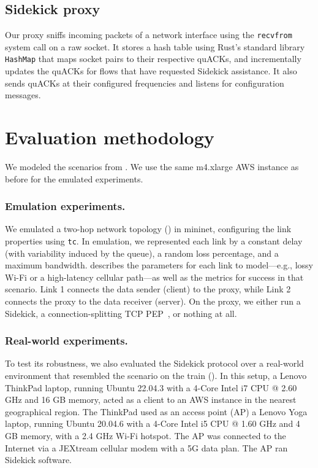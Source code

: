 \subsection{Sidekick proxy}
\label{sec:sidekick:implementation:proxy}

Our proxy sniffs incoming packets of a network interface using the
\texttt{recvfrom} system call on a raw socket.
It stores a hash table using Rust's standard library \texttt{HashMap} that maps
socket pairs to their respective quACKs, and
incrementally updates the quACKs for flows that have requested Sidekick assistance.
It also sends quACKs at their configured frequencies and listens for
configuration messages.

\section{Evaluation methodology}
\label{sec:sidekick:methodology}



We modeled the scenarios from . We use the same
m4.xlarge AWS instance as before for the emulated experiments.

\subsubsection{Emulation experiments.}

We emulated a two-hop network topology () in mininet,
configuring the link properties using \texttt{tc}.
In emulation, we represented
each link by a constant delay (with variability induced by the queue), a random
loss percentage, and a maximum bandwidth.
 describes the parameters
for each link to model---e.g., lossy Wi-Fi or a high-latency cellular
path---as well as the metrics for success in that scenario.
Link 1 connects the data sender (client) to the proxy,
while Link 2 connects the proxy to the data receiver (server).
On the proxy, we either run a Sidekick,
a connection-splitting TCP PEP~\cite{caini2006pepsal}, or nothing at all.

\subsubsection{Real-world experiments.}

To test its robustness, we also evaluated the Sidekick protocol over a real-world
environment that resembled the scenario on the train ().
In this setup, a Lenovo ThinkPad laptop, running Ubuntu 22.04.3 with a 4-Core
Intel i7 CPU @ 2.60 GHz and 16 GB memory, acted as a client to an AWS instance in
the nearest geographical region. The ThinkPad used as an access point (AP)
a Lenovo Yoga laptop, running Ubuntu 20.04.6 with a 4-Core Intel i5 CPU @
1.60 GHz and 4 GB memory, with a 2.4 GHz Wi-Fi hotspot.
The AP was connected to the Internet via a JEXtream cellular modem
with a 5G data plan. The AP ran Sidekick software.

